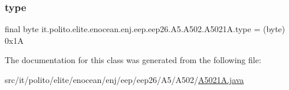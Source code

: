 \subsubsection{\texorpdfstring{type}{type}}
{\footnotesize\ttfamily final byte it.\+polito.\+elite.\+enocean.\+enj.\+eep.\+eep26.\+A5.\+A502.\+A5021\+A.\+type = (byte) 0x1A\hspace{0.3cm}{\ttfamily [static]}}



The documentation for this class was generated from the following file\+:\begin{DoxyCompactItemize}
\item 
src/it/polito/elite/enocean/enj/eep/eep26/\+A5/\+A502/\hyperlink{_a5021_a_8java}{A5021\+A.\+java}\end{DoxyCompactItemize}
